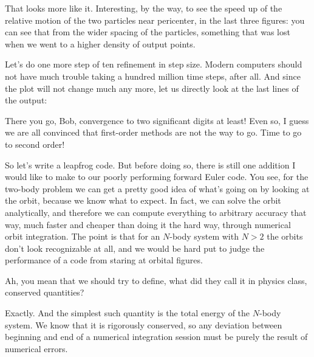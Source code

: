 \abc

\alice
That looks more like it.  Interesting, by the way, to see the speed up
of the relative motion of the two particles near pericenter, in the
last three figures: you can see that from the wider spacing of the
particles, something that was lost when we went to a higher density of
output points.

\carol
Let's do one more step of ten refinement in step size.  Modern
computers should not have much trouble taking a hundred million time
steps, after all.  And since the plot will not change much any more,
let us directly look at the last lines of the output:

\cba


\abc

\carol
There you go, Bob, convergence to two significant digits at least!
Even so, I guess we are all convinced that first-order methods are not
the way to go.  Time to go to second order!

\alice
So let's write a leapfrog code.  But before doing so, there is still
one addition I would like to make to our poorly performing forward
Euler code.  You see, for the two-body problem we can get a pretty
good idea of what's going on by looking at the orbit, because we know
what to expect.  In fact, we can solve the orbit analytically, and
therefore we can compute everything to arbitrary accuracy that way,
much faster and cheaper than doing it the hard way, through numerical
orbit integration.  The point is that for an $N$-body system with
$N>2$ the orbits don't look recognizable at all, and we would be hard
put to judge the performance of a code from staring at orbital figures.

\bob
Ah, you mean that we should try to define, what did they call it in
physics class, conserved quantities?

\alice
Exactly.  And the simplest such quantity is the total energy of the
$N$-body system.  We know that it is rigorously conserved, so any
deviation between beginning and end of a numerical integration session
must be purely the result of numerical errors.


